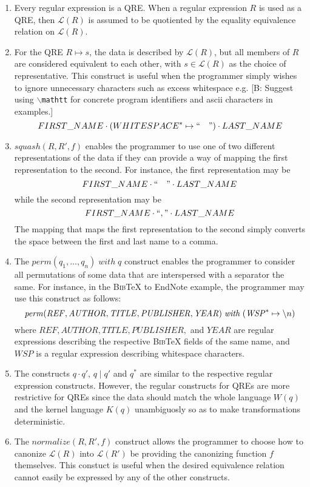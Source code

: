 \documentclass{svproc}
\newcommand{\FINISH}[3]{\ifdraft\textcolor{#1}{[#2: #3]}\fi}
\newcommand{\bcp}[1]{\FINISH{dkred}{B}{#1}}
\newcommand{\re}[1]{\ensuremath{\mathit{#1}}}
\newcommand{\squash}[3]{\ensuremath{\mathit{squash}(#1, #2, #3)}}
\newcommand{\perm}[2]{\ensuremath{\mathit{perm}(#1)\; \mathit{with}\; #2}}
\newcommand{\normalize}[3]{\ensuremath{\mathit{normalize}(#1, #2, #3)}}
\newcommand{\sep}{\ensuremath{\; | \;}}
\begin{document}
  \begin{enumerate}
    \item 
    Every regular expression is a QRE. When a regular expression $R$ is used as
    a QRE, then $\mathcal{L}(R)$ is assumed to be quotiented by the equality
    equivalence relation on $\mathcal{L}(R)$.
    \item
    For the QRE $R \mapsto s$, the data is described by $\mathcal{L}(R)$, but
    all members of $R$ are considered equivalent to each other, with $s \in
    \mathcal{L}(R)$ as the choice of representative. This construct is useful
    when the programmer simply wishes to ignore unnecessary characters such as
    excess whitespace e.g. \bcp{Suggest using $\backslash${\tt mathtt} for 
      concrete program identifiers and ascii characters in examples.}
    $$FIRST\_NAME \cdot (WHITESPACE^* \mapsto `` \quad ") \cdot LAST\_NAME$$
    \item
    $\squash{R}{R'}{f}$ enables the programmer to use one of two different
    representations of the data if they can provide a way of mapping the first
    representation to the second. For instance, the first representation may be
    $$FIRST\_NAME \cdot `` \quad " \cdot LAST\_NAME$$
    while the second representation may be
    $$FIRST\_NAME \cdot ``," \cdot LAST\_NAME$$
    The mapping that maps the first representation to the second simply converts
    the space between the first and last name to a comma.
    \item
    The $\perm{q_1, \ldots, q_n}{q}$ construct enables the programmer to
    consider all permutations of some data that are interspersed with a
    separator the same. For instance, in the \textsc{Bib}\TeX{} to EndNote
    example, the programmer may use this construct as follows:
    $$\perm{\re{REF}, \re{AUTHOR}, \re{TITLE}, \re{PUBLISHER},
    \re{YEAR}}{(\re{WSP}^* \mapsto \string \n)}$$
 where $\re{REF}, \re{AUTHOR}, \re{TITLE}, \re{PUBLISHER},$ and $\re{YEAR}$ are
regular expressions describing the respective \textsc{Bib}\TeX\; fields of the
same name, and $WSP$ is a regular expression describing whitespace characters.
\item
The constructs $q \cdot q'$, $q \sep q'$ and $q^*$ are similar to the respective
regular expression constructs. However, the regular constructs for QREs are more
restrictive for QREs since the data should match the whole language $W(q)$ and
the kernel language $K(q)$ unambiguosly so as to make transformations
deterministic.
\item
The $\normalize{R}{R'}{f}$ construct allows the programmer to choose how to
canonize $\mathcal{L}(R)$ into $\mathcal{L}(R')$ be providing the canonizing
function $f$ themselves. This constuct is useful when the desired equivalence
relation cannot easily be expressed by any of the other constructs.
  \end{enumerate}
\end{document}
